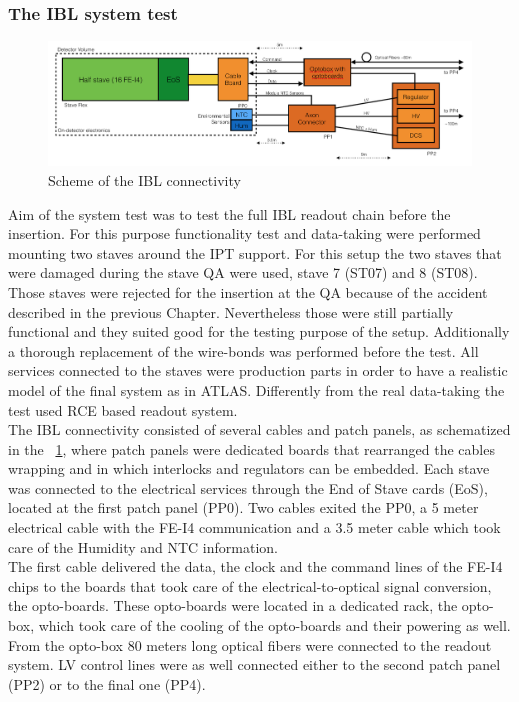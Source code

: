 \subsubsection{The IBL system test}
%
\begin{figure}
\includegraphics[width=1.0\textwidth]{Images/IBL_paper/chapter08_Commissioning/IBL_connectivity.png}
\caption{Scheme of the IBL connectivity}
\label{fig:ibl_conn}
\end{figure}
Aim of the system test was to test the full IBL readout chain before the  insertion. For this purpose functionality test and data-taking were performed mounting two staves around the IPT support. For this setup the two staves that were damaged during the stave QA were used, stave 7 (ST07) and 8 (ST08). Those staves were rejected for the insertion at the QA because of the accident described in the previous Chapter. Nevertheless those were still partially functional and they suited good for the testing purpose of the setup. Additionally a thorough replacement of the wire-bonds was performed before the test. All services connected to the staves were production parts in order to have a realistic model of the final system as in ATLAS. Differently from the real data-taking the test used RCE based readout system.\\
The IBL connectivity consisted of several cables and patch panels, as schematized in the ~\ref{fig:ibl_conn}, where patch panels were dedicated boards that rearranged the cables wrapping and in which interlocks and regulators can be embedded.
Each stave was connected to the electrical services through the End of Stave cards (EoS), located at the first patch panel (PP0). Two cables exited the PP0, a 5 meter electrical cable with the FE-I4 communication and a 3.5 meter cable which took care of the Humidity and NTC information.\\
The first cable delivered the data, the clock and the command lines of the FE-I4 chips to the boards that took care of the electrical-to-optical signal conversion, the opto-boards. These opto-boards were located in a dedicated rack, the opto-box, which took care of the cooling of the opto-boards and their powering as well. From the opto-box 80 meters long optical fibers were connected to the readout system. LV control lines were as well connected either to the second patch panel (PP2) or to the final one (PP4).\\
